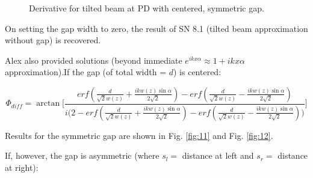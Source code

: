\documentclass[aps,twoside,secnumarabic,balancelastpage,amsmath,amssymb,nofootinbib,hyperref=pdftex]{revtex4}
\begin{document}
		\begin{figure}
	\centering
	\caption{Derivative for tilted beam at PD with centered, symmetric gap.}
	\label{fig:10}
	\end{figure}

\clearpage

On setting the gap width to zero, the result of SN 8.1 (tilted beam approximation without gap) is recovered.

Alex also provided solutions (beyond immediate $e^{ikx\alpha} \approx 1 + ikx\alpha$ approximation).If the gap (of total width = $d$) is centered:

\begin{equation}
\Phi_{diff} =
\arctan 
\Big[
    \frac
    {
        erf
        (
            \frac{d}{\sqrt{2} w(z)}
            +
            \frac{ikw(z) \sin \alpha}{2 \sqrt{2}}
        )
        -
        erf
        (
            \frac{d}{\sqrt{2} w(z)}
            -
            \frac{ikw(z) \sin \alpha}{2 \sqrt{2}}
        )
    }
    { 
        i
        \Big(
            2 - erf
                (
                    \frac{d}{\sqrt{2} w(z)}
                    +
                    \frac{i kw(z) \sin \alpha}{2 \sqrt{2}}
                 )
             -
             erf
                 (
                     \frac{d}{\sqrt{2} w(z)}
                     -
                     \frac{ikw(z) \sin \alpha}{2 \sqrt{2}}
                 )
        \Big)
    } 
\Big]
\end{equation}

Results for the symmetric gap are shown in Fig. \ref{fig:11} and Fig. \ref{fig:12}.

If, however, the gap is asymmetric (where $s_l =$ distance at left and $s_r =$ distance at right):
\end{document}
